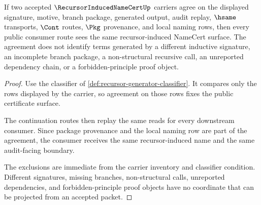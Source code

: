 \begin{theorem}
\label{thm:recursor-generator-non-escape-boundary}
If two accepted $\RecursorInducedNameCertUp$ carriers agree on the displayed signature, motive, branch package, generated output, audit replay, $\hsame$ transports, $\Cont$ routes, $\Pkg$ provenance, and local naming rows, then every public consumer route sees the same recursor-induced NameCert surface. The agreement does not identify terms generated by a different inductive signature, an incomplete branch package, a non-structural recursive call, an unreported dependency chain, or a forbidden-principle proof object.
\end{theorem}
\begin{proof}
Use the classifier of \autoref{def:recursor-generator-classifier}. It compares only the rows displayed by the carrier, so agreement on those rows fixes the public certificate surface.

The continuation routes then replay the same reads for every downstream consumer. Since package provenance and the local naming row are part of the agreement, the consumer receives the same recursor-induced name and the same audit-facing boundary.

The exclusions are immediate from the carrier inventory and classifier condition. Different signatures, missing branches, non-structural calls, unreported dependencies, and forbidden-principle proof objects have no coordinate that can be projected from an accepted packet.
\end{proof}


\begin{closurestatus}{\RecursorInducedNameCertUp}
  \theoryclosure{\seedClosure}
  \formalstatus{\unformalizedV}
\end{closurestatus}
